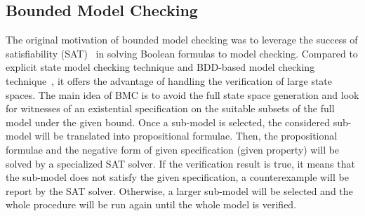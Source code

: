 \subsection{Bounded Model Checking}

The original motivation of bounded model checking was to leverage the success of satisfiability (SAT)~\cite{prasad_biere_gupta_sat_survey_2005,een_extensible_sat_solver_2003} in solving Boolean formulas to model checking. Compared to explicit state model checking technique and BDD-based model checking technique~\cite{biere_cimatti_clarke_zhu_symbolic_model_checking_without_bdds_1999,sentovich_bdd_package_performance_1996}, it offers the advantage of handling the verification of large state spaces. The main idea of BMC is to avoid the full state space generation and look for witnesses of an existential specification on the suitable subsets of the full model under the given bound. Once a sub-model is selected, the considered sub-model will be translated into propositional formulae. Then,
the propositional formulae and the negative form of given specification (given property) will be solved by a specialized SAT solver. If the verification result is true, it means that the sub-model does not satisfy the given specification, a counterexample will be report by the SAT solver. Otherwise, a larger sub-model will be selected and the whole procedure will be run again until the whole model is verified.






